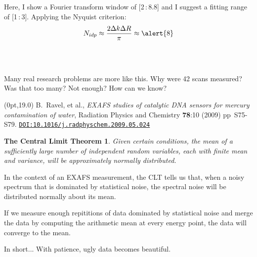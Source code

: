 \documentclass[10pt, xcolor=x11names, compress]{beamer}
\newtheorem{clt}[theorem]{The Central Limit Theorem}
\begin{document}
\begin{frame}
\begin{columns}
\begin{column}{0.5\linewidth}
\begin{center}
      \end{center}
    \end{column}
  \end{columns}
  Here, I show a Fourier transform window of [2\,:\,8.8] and I suggest a
  fitting range of [1\,:\,3].  Applying the Nyquist criterion:
  \begin{equation}
    \notag N_{idp} \approx \frac{2\Delta k\Delta R}{\pi} \approx \alert{8}
  \end{equation}

  ~\\[-7ex]
  ~

  \begin{exampleblock}{}
    \begin{center}
      Many real research problems are more like this.  Why were 42
      scans measured?  Was that too many?  Not enough?  How can we know?
    \end{center}
  \end{exampleblock}

  \begin{textblock*}{0.7\linewidth}(0pt,19.0\TPVertModule)%
    \tiny%
    B.\ Ravel, et al., \textit{EXAFS studies of catalytic DNA sensors
      for mercury contamination of water}, Radiation Physics and
    Chemistry \textbf{78}:10 (2009) pp\ S75-S79.
    \href{http://dx.doi.org/10.1016/j.radphyschem.2009.05.024}
    {\color{Blue4}\texttt{DOI:10.1016/j.radphyschem.2009.05.024}}
  \end{textblock*}
\end{frame}


\begin{frame}
  \begin{clt}
    Given certain conditions, the mean of a sufficiently large number
    of independent random variables, each with finite mean and
    variance, will be approximately normally distributed.
  \end{clt}

  \bigskip

  In the context of an EXAFS measurement, the CLT tells us that, when a
  noisy spectrum that is dominated by statistical noise, the spectral
  noise will be distributed normally about its mean.

  \bigskip

  If we measure enough repititions of data dominated by statistical
  noise and merge the data by computing the arithmetic mean at every
  energy point, the data will converge to the mean.

  \begin{block}{In short...}
    With patience, ugly data becomes beautiful.
  \end{block}
\end{frame}
\end{document}
